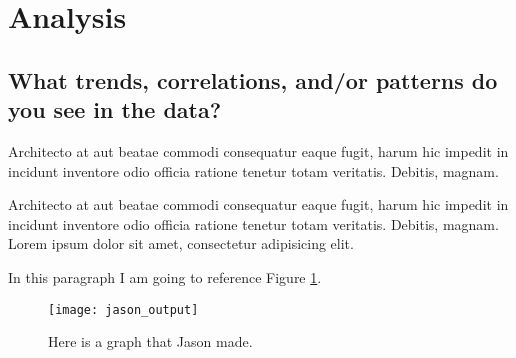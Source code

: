 \section{Analysis}

\subsection{What trends, correlations, and/or patterns do you see in the data?}

Architecto at aut beatae commodi consequatur eaque fugit, harum hic impedit in incidunt inventore odio officia ratione tenetur totam veritatis. Debitis, magnam.

Architecto at aut beatae commodi consequatur eaque fugit, harum hic impedit in incidunt inventore odio officia ratione tenetur totam veritatis. Debitis, magnam. Lorem ipsum dolor sit amet, consectetur adipisicing elit.

In this paragraph I am going to reference Figure \ref{fig:jason1}.

\begin{figure}
    \texttt{[image: jason\_output]}
    \caption{Here is a graph that Jason made.}
    \label{fig:jason1}
\end{figure}